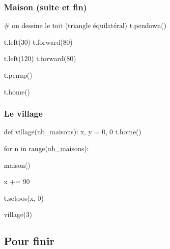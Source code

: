\documentclass{beamer}
\begin{document}
\begin{frame}[fragile]
   \frametitle{Maison (suite et fin)}

   \begin{pyverbatim}
         # on dessine le toit (triangle équilatéral)
         t.pendown()
   \end{pyverbatim}
   \pause
   \begin{pyverbatim}
         t.left(30)
         t.forward(80)
   \end{pyverbatim}
   \pause
   \begin{pyverbatim}
         t.left(120)
         t.forward(80)
   \end{pyverbatim}
   \pause
   \begin{pyverbatim}
         t.penup()
   \end{pyverbatim}
   \pause
   \begin{pyverbatim}
         t.home()
   \end{pyverbatim}
\end{frame}

\begin{frame}[fragile]
   \frametitle{Le village}

   \begin{pyverbatim}
      def village(nb_maisons):
         x, y = 0, 0
         t.home()
   \end{pyverbatim}
   \pause
   \begin{pyverbatim}
         for n in range(nb_maisons):
   \end{pyverbatim}
   \pause\begin{pyverbatim}
            maison()
   \end{pyverbatim}
   \pause
   \begin{pyverbatim}
            x += 90
   \end{pyverbatim}
   \pause
   \begin{pyverbatim}
            t.setpos(x, 0)
   \end{pyverbatim}
   \pause
   \begin{pyverbatim}

      village(3)
   \end{pyverbatim}
\end{frame}

   \subsection{Pour finir}\label{subsec:pour-finir}
\end{document}
